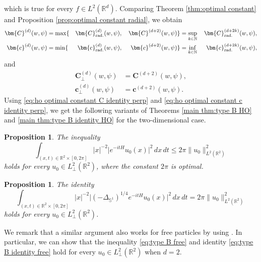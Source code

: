 \documentclass[reqno]{amsart}
\theoremstyle{plain}
\newtheorem{proposition}[theorem]{Proposition}
\numberwithin{equation}{section}
\theoremstyle{remark}
\newcommand{\R}{\mathbb{R}}
\newcommand{\N}{\mathbb{N}}
\renewcommand{\S}{\mathbb{S}}
\newcommand{\intervalcc}[2]{[#1, #2]}
\newcommand{\rad}{\textup{rad.}}
\newcommand{\Lperp}{L^2_{\perp}}
\newcommand{\abs}[1]{\lvert#1\rvert}
\newcommand{\norm}[1]{\lVert#1\rVert}
\newcommand{\Hamiltonian}{H}
\newcommand{\Laplacian}{\Delta}
\newcommand{\const}{\bm{c}}
\newcommand{\Const}{\bm{C}}
\newcommand{\hoconst}{\const}
\newcommand{\hoConst}{\Const}
\newcommand{\hoconstwpd}[3]{\hoconst^{(#3)}(#1, #2)}
\newcommand{\hoConstwpd}[3]{\hoConst^{(#3)}(#1, #2)}
\newcommand{\hoconstwpdrad}[3]{\hoconst_{\rad}^{(#3)}(#1, #2)}
\newcommand{\hoConstwpdrad}[3]{\hoConst_{\rad}^{(#3)}(#1, #2)}
\newcommand{\hoconstwpdperp}[3]{\hoconst_{\perp}^{(#3)}(#1, #2)}
\newcommand{\hoConstwpdperp}[3]{\hoConst_{\perp}^{(#3)}(#1, #2)}
\begin{document}
which is true for every $f \in L^2(\R^d)$.
Comparing Theorem \ref{thm:optimal constant} and Proposition \ref{prop:optimal constant radial}, we obtain
\begin{alignat}{4}
	\hoConstwpd{w}{\psi}{d} &= \max \{& \hoConstwpdrad{w}{\psi}{d} , {}& &\hoConstwpd{w}{\psi}{d+2} & \} = \sup_{k \in \N} {}&\hoConstwpdrad{w}{\psi}{d+2k} , 
	\label{eq:ho optimal constant C identity rad} \\
	\hoconstwpd{w}{\psi}{d} &= \min \{& \hoconstwpdrad{w}{\psi}{d} , {}& &\hoconstwpd{w}{\psi}{d+2} & \} = \inf_{k \in \N} {}&\hoconstwpdrad{w}{\psi}{d+2k} ,
	\label{eq:ho optimal constant c identity rad}
\end{alignat}
and
\begin{align}
\hoConstwpdperp{w}{\psi}{d} &= \hoConstwpd{w}{\psi}{d+2} , 
\label{eq:ho optimal constant C identity perp} \\
\hoconstwpdperp{w}{\psi}{d} &= \hoconstwpd{w}{\psi}{d+2} .
\label{eq:ho optimal constant c identity perp}
\end{align}
Using \eqref{eq:ho optimal constant C identity perp} and \eqref{eq:ho optimal constant c identity perp}, we get the following variants of Theorems \ref{main thm:type B HO} and \ref{main thm:type B identity HO} for the two-dimensional case. 
\begin{proposition}
The inequality
\begin{equation} \label{eq:type B HO 2D}
			\int_{(x, t) \in \R^2 \times \intervalcc{0}{2\pi}} \abs{x}^{-2} \abs{  e^{- i t \Hamiltonian} u_0(x) }^2 \, dx \, dt \leq 2\pi \norm{ u_0 }_{L^2(\R^2)}^2 
\end{equation}
holds for every $u_0 \in \Lperp(\R^2)$, where the constant $2\pi$ is optimal.
\end{proposition}
\begin{proposition}
	The identity
		\begin{equation} \label{eq:type B identity HO 2D}
	\int_{(x, t) \in \R^2 \times \intervalcc{0}{2\pi}} \abs{x}^{-2} \abs{ (-\Laplacian_{\S^{1}})^{1/4} e^{- i t \Hamiltonian} u_0(x) }^2 \, dx \, dt = 2\pi \norm{u_0}_{L^2(\R^2)}^2
\end{equation}
holds for every $u_0 \in \Lperp(\R^2)$.
\end{proposition}
We remark that a similar argument also works for free particles by using \citet[Theorem 5.4]{BS2014}.
In particular, we can show that the inequality \eqref{eq:type B free} and identity \eqref{eq:type B identity free} hold for every $u_0 \in \Lperp(\R^2)$ when $d=2$.
\end{document}
